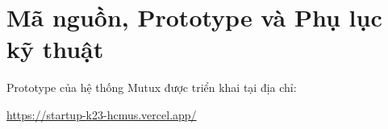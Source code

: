 \section{Mã nguồn, Prototype và Phụ lục kỹ thuật}

Prototype của hệ thống Mutux được triển khai tại địa chỉ:

\begin{center}
    \href{https://startup-k23-hcmus.vercel.app/}{https://startup-k23-hcmus.vercel.app/}
\end{center}
